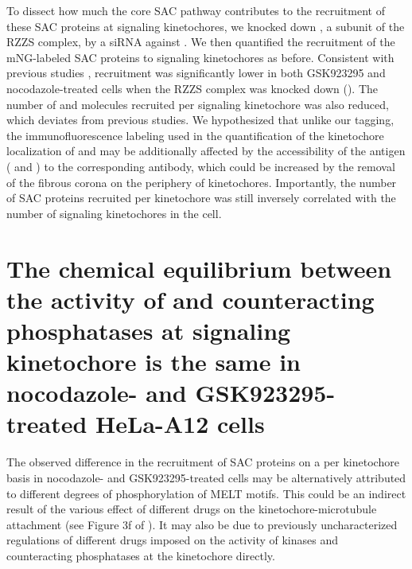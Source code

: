 To dissect how much the core SAC pathway contributes to the recruitment of these SAC proteins at signaling kinetochores, we knocked down , a subunit of the RZZS complex, by a siRNA against . We then quantified the recruitment of the mNG-labeled SAC proteins to signaling kinetochores as before. Consistent with previous studies \cite{CENPELocalization-BUBR1,siROD_Zhang2019},  recruitment was significantly lower in both GSK923295 and nocodazole-treated cells when the RZZS complex was knocked down (). The number of  and  molecules recruited per signaling kinetochore was also reduced, which deviates from previous studies. We hypothesized that unlike our  tagging, the immunofluorescence labeling used in the quantification of the kinetochore localization of  and  \cite{BUBR1_XenopusVSHeLa,siROD_Zhang2019} may be additionally affected by the accessibility of the antigen ( and ) to the corresponding antibody, which could be increased by the removal of the fibrous corona on the periphery of kinetochores. Importantly, the number of SAC proteins recruited per kinetochore was still inversely correlated with the number of signaling kinetochores in the cell.

\section{The chemical equilibrium between the activity of  and counteracting phosphatases at signaling kinetochore is the same in nocodazole- and GSK923295-treated HeLa-A12 cells}
\label{MPS1sen-KTSection}

The observed difference in the recruitment of SAC proteins on a per kinetochore basis in nocodazole- and GSK923295-treated cells may be alternatively attributed to different degrees of phosphorylation of MELT motifs. This could be an indirect result of the various effect of different drugs on the kinetochore-microtubule attachment (see Figure 3f of \cite{Rheostat}). It may also be due to previously uncharacterized regulations of different drugs imposed on the activity of kinases and counteracting phosphatases at the kinetochore directly.

